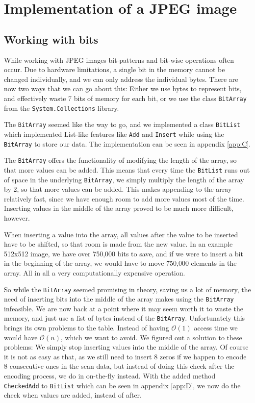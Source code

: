 \section{Implementation of a JPEG image}

\subsection{Working with bits}
While working with JPEG images bit-patterns and bit-wise operations often occur.
Due to hardware limitations, a single bit in the memory cannot be changed individually, and we can only address the individual bytes.
There are now two ways that we can go about this:
Either we use bytes to represent bits, and effectively waste 7 bits of memory for each bit, or we use the class \lstinline|BitArray| from the \lstinline|System.Collections| library.

The \lstinline|BitArray| seemed like the way to go, and we implemented a class \lstinline|BitList| which implemented List-like features like \lstinline|Add| and \lstinline|Insert| while using the \lstinline|BitArray| to store our data.
The implementation can be seen in appendix \ref{app:C}. 

The \lstinline|BitArray| offers the functionality of modifying the length of the array, so that more values can be added.
This means that every time the \lstinline|BitList| runs out of space in the underlying \lstinline|BitArray|, we simply multiply the length of the array by 2, so that more values can be added.
This makes appending to the array relatively fast, since we have enough room to add more values most of the time.
Inserting values in the middle of the array proved to be much more difficult, however.

When inserting a value into the array, all values after the value to be inserted have to be shifted, so that room is made from the new value.
In an example 512x512 image, we have over 750,000 bits to save, and if we were to insert a bit in the beginning of the array, we would have to move 750,000 elements in the array.
All in all a very computationally expensive operation.

So while the \lstinline|BitArray| seemed promising in theory, saving us a lot of memory, the need of inserting bits into the middle of the array makes using the \lstinline|BitArray| infeasible.
We are now back at a point where it may seem worth it to waste the memory, and just use a list of bytes instead of the \lstinline|BitArray|.
Unfortunately this brings its own problems to the table.
Instead of having $\mathcal{O}(1)$ access time we would have $\mathcal{O}(n)$, which we want to avoid.
We figured out a solution to these problems:
We simply stop inserting values into the middle of the array.
Of course it is not as easy as that, as we still need to insert 8 zeros if we happen to encode 8 consecutive ones in the scan data, but instead of doing this check after the encoding process, we do in on-the-fly instead.
With the added method \lstinline|CheckedAdd| to \lstinline|BitList| which can be seen in appendix \ref{app:D}, we now do the check when values are added, instead of after. 